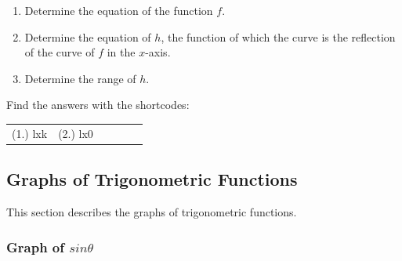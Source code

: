 \begin{enumerate}[noitemsep, label=\textbf{\arabic*}. ]
\begin{figure}[H]
\begin{center}
      \vspace{2pt}
    \vspace{.1in}
    \end{center}
 \end{figure}       \label{m39348*id253324}\begin{enumerate}[noitemsep, label=\textbf{\alph*}. ] 
            \label{m39348*uid203}\item Determine the equation of the function $f$.
\label{m39348*uid204}\item Determine the equation of $h$, the function of which the curve is the reflection of the curve of $f$ in the $x$-axis.
\label{m39348*uid205}\item Determine the range of $h$.
\end{enumerate}
                \end{enumerate}
    \label{m39348*eip-714}
\par {} Find the answers with the shortcodes:
 \par \begin{tabular}[h]{cccccc}
 (1.) lxk  &  (2.) lx0  & \end{tabular}
  \label{m39414*cid7}
            \subsection{ Graphs of Trigonometric Functions}
            \nopagebreak
      \label{m39414*id83471}This section describes the graphs of trigonometric functions.\par 
      \label{m39414*uid30}
            \subsubsection{ Graph of $sin\theta $}
            \nopagebreak
\label{m39414*secfhsst!!!underscore!!!id1866}
